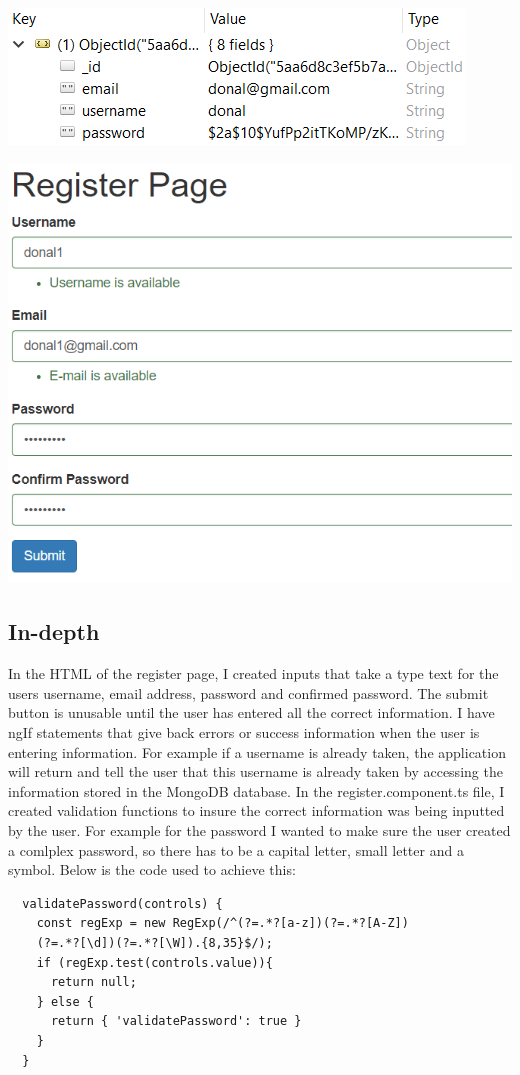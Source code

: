 \includegraphics[]{img/UserInfo.png}

\includegraphics[]{img/UserInterface.png}



\subsection{In-depth}
In the HTML of the register page, I created inputs that take a type text for the users username, email address, password and confirmed password. The submit button is unusable until the user has entered all the correct information. I have ngIf statements that give back errors or success information when the user is entering information. For example if a username is already taken, the application will return and tell the user that this username is already taken by accessing the information stored in the MongoDB database. In the register.component.ts file, I created validation functions to insure the correct information was being inputted by the user. For example for the password I wanted to make sure the user created a comlplex password, so there has to be a capital letter, small letter and a symbol. Below is the code used to achieve this:
\begin{lstlisting}
  validatePassword(controls) {
    const regExp = new RegExp(/^(?=.*?[a-z])(?=.*?[A-Z])
    (?=.*?[\d])(?=.*?[\W]).{8,35}$/);
    if (regExp.test(controls.value)){
      return null;
    } else {
      return { 'validatePassword': true }
    }
  }
  
\end{lstlisting}

